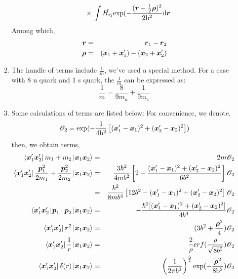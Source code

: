 \documentclass[11pt]{article}
\newcommand{\bm}[1]{\mbox{\boldmath{$#1$}}}
\begin{document}
\begin{enumerate}
\begin{enumerate}
\begin{eqnarray}
&&{}\times{}\int\hat{H_{i j}}\rm{exp}(-\frac{(\bm{r}-\frac{1}{2}\bm{\rho})^2}{2b^2}\rm{d}\bm{r}
\end{eqnarray}
Among which,
\begin{eqnarray}
\bm{r}&=&\bm{r}_1-\bm{r}_2\\
\bm{\rho}&=&(\bm{x}_{1}+\bm{x}_{1}^\prime)-(\bm{x}_{2}+\bm{x}_{2}^\prime)
\end{eqnarray}
\item The handle of terms include $\frac{1}{m}$, we've used a special method.
For a case with 8 u quark and 1 s quark, the $\frac{1}{m}$ can be expressed as:
\begin{equation}
\frac{1}{m}=\frac{8}{9m_u}+\frac{1}{9m_s}
\end{equation}
\item Some calculations of terms are listed below:
For convenience, we denote,
\begin{equation}
\mathscr{O}_2=\rm{exp}(-\frac{1}{4b^2}\left[(\bm{x}_{1}^\prime-\bm{x}_{1})^2
+(\bm{x}_{2}^\prime-\bm{x}_{2})^2\right])
\end{equation}
then, we obtain terms,
\begin{eqnarray}
\bra{\bm{x}_{1}^\prime\bm{x}_{2}^\prime}m_{1}+m_{2}\ket{\bm{x}_{1}\bm{x}_{2}}&=&2m\mathscr{O}_2\\
\bra{\bm{x}_{1}^\prime\bm{x}_{2}^\prime}\frac{\bm{p}_{1}^2}{2m_{1}}+\frac{\bm{p}_{2}^2}{2m_{2}}\ket{\bm{x}_{1}\bm{x}_{2}}
&=&\frac{3\hbar^2}{4mb^2}\left[2-\frac{(\bm{x}_{1}^\prime-\bm{x}_{1})^2
+(\bm{x}_{2}^\prime-\bm{x}_{2})^2}{6b^2}\right]\mathscr{O}_2\nonumber\\
&=&\frac{\hbar^2}{8mb^4}\left[12b^2-(\bm{x}_{1}^\prime-\bm{x}_{1})^2
+(\bm{x}_{2}^\prime-\bm{x}_{2})^2\right]\mathscr{O}_2\\
\bra{\bm{x}_{1}^\prime\bm{x}_{2}^\prime}\bm{p}_1\cdot\bm{p}_2\ket{\bm{x}_{1}\bm{x}_{2}}&=&
-\frac{\hbar^2[(\bm{x}_{1}^\prime-\bm{x}_{1})^2
+ (\bm{x}_{2}^\prime-\bm{x}_{2})^2]}{4b^4}\mathscr{O}_2\\
\bra{\bm{x}_{1}^\prime\bm{x}_{2}^\prime}\bm{r}^2\ket{\bm{x}_{1}\bm{x}_{2}}&=&(3b^2+\frac{\bm{\rho}^2}{4})\mathscr{O}_2\\
\bra{\bm{x}_{1}^\prime\bm{x}_{2}^\prime}\frac{1}{r}\ket{\bm{x}_{1}\bm{x}_{2}}&=&\frac{2}{\rho}erf(\frac{\rho}{\sqrt{8b^2}})\mathscr{O}_2\\
\bra{\bm{x}_{1}^\prime\bm{x}_{2}^\prime}\delta(r)\ket{\bm{x}_{1}\bm{x}_{2}}&=&\left(\frac{1}{2\pi{}b^2}\right)^{\frac{3}{2}}
\rm{exp}(-\frac{\bm{\rho}^2}{8b^2})\mathscr{O}_2
\end{eqnarray}

\end{enumerate}
\end{enumerate}
\end{document}
